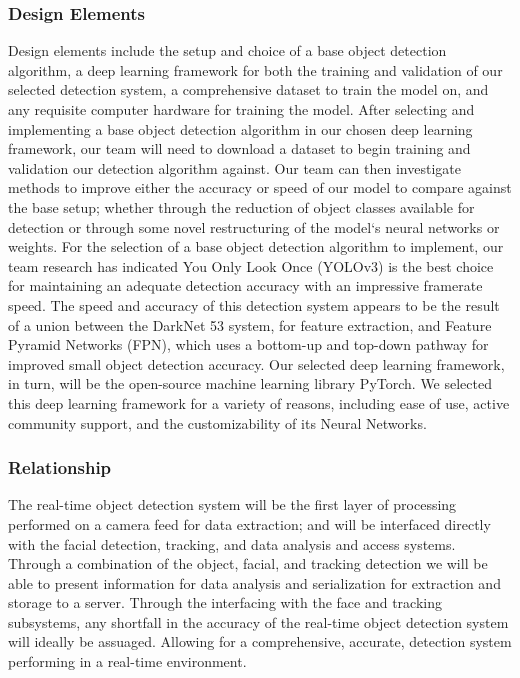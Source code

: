 \subsubsection{Design Elements} 

Design elements include the setup and choice of a base object detection algorithm, a deep learning framework for both the training and validation of our selected detection system, a comprehensive dataset to train the model on, and any requisite computer hardware for training the model. After selecting and implementing a base object detection algorithm in our chosen deep learning framework, our team will need to download a dataset to begin training and validation our detection algorithm against. Our team can then investigate methods to improve either the accuracy or speed of our model to compare against the base setup; whether through the reduction of object classes available for detection or through some novel restructuring of the model`s neural networks or weights. For the selection of a base object detection algorithm to implement, our team research has indicated You Only Look Once (YOLOv3) is the best choice for maintaining an adequate detection accuracy with an impressive framerate speed\cite{YOLOv3}. The speed and accuracy of this detection system appears to be the result of a union between the DarkNet 53 system, for feature extraction, and Feature Pyramid Networks (FPN), which uses a bottom-up and top-down pathway for improved small object detection accuracy. Our selected deep learning framework, in turn, will be the open-source machine learning library PyTorch. We selected this deep learning framework for a variety of reasons, including ease of use, active community support, and the customizability of its Neural Networks.

\subsubsection{Relationship}

The real-time object detection system will be the first layer of processing performed on a camera feed for data extraction; and will be interfaced directly with the facial detection, tracking, and data analysis and access systems. Through a combination of the object, facial, and tracking detection we will be able to present information for data analysis and serialization for extraction and storage to a server. Through the interfacing with the face and tracking subsystems, any shortfall in the accuracy of the real-time object detection system will ideally be assuaged. Allowing for a comprehensive, accurate, detection system performing in a real-time environment.


